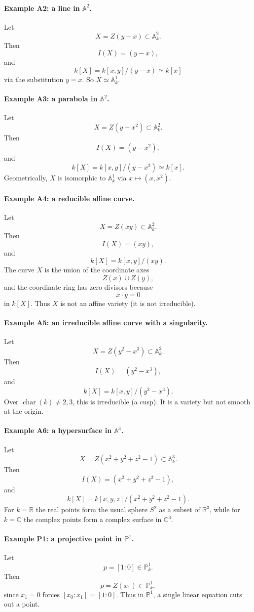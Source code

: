 \documentclass[12pt,a4paper]{article}
\theoremstyle{plain}
\theoremstyle{definition}      %
\begin{document}
\paragraph{Example A2: a line in \(\mathbb A^2\).}
Let
\[
X=Z(y-x)\subset \mathbb A^2_k.
\]
Then
\[
I(X)=(y-x),
\]
and
\[
k[X]=k[x,y]/(y-x)\simeq k[x]
\]
via the substitution \(y=x\).
So \(X\simeq \mathbb A^1_k\).

\paragraph{Example A3: a parabola in \(\mathbb A^2\).}
Let
\[
X=Z(y-x^2)\subset \mathbb A^2_k.
\]
Then
\[
I(X)=(y-x^2),
\]
and
\[
k[X]=k[x,y]/(y-x^2)\simeq k[x].
\]
Geometrically, \(X\) is isomorphic to \(\mathbb A^1_k\) via \(x\mapsto (x,x^2)\).

\paragraph{Example A4: a reducible affine curve.}
Let
\[
X=Z(xy)\subset \mathbb A^2_k.
\]
Then
\[
I(X)=(xy),
\]
and
\[
k[X]=k[x,y]/(xy).
\]
The curve \(X\) is the union of the coordinate axes
\[
Z(x)\cup Z(y),
\]
and the coordinate ring has zero divisors because
\[
\overline{x}\cdot \overline{y}=0
\]
in \(k[X]\).
Thus \(X\) is not an affine variety (it is not irreducible).

\paragraph{Example A5: an irreducible affine curve with a singularity.}
Let
\[
X=Z(y^2-x^3)\subset \mathbb A^2_k.
\]
Then
\[
I(X)=(y^2-x^3),
\]
and
\[
k[X]=k[x,y]/(y^2-x^3).
\]
Over \(\operatorname{char}(k)\neq 2,3\), this is irreducible (a cusp).
It is a variety but not smooth at the origin.

\paragraph{Example A6: a hypersurface in \(\mathbb A^3\).}
Let
\[
X=Z(x^2+y^2+z^2-1)\subset \mathbb A^3_k.
\]
Then
\[
I(X)=(x^2+y^2+z^2-1),
\]
and
\[
k[X]=k[x,y,z]/(x^2+y^2+z^2-1).
\]
For \(k=\mathbb R\) the real points form the usual sphere \(S^2\) as a subset of \(\mathbb R^3\),
while for \(k=\mathbb C\) the complex points form a complex surface in \(\mathbb C^3\).

\paragraph{Example P1: a projective point in \(\mathbb P^1\).}
Let
\[
p=[1:0]\in \mathbb P^1_k.
\]
Then
\[
p=Z(x_1)\subset \mathbb P^1_k,
\]
since \(x_1=0\) forces \([x_0:x_1]=[1:0]\).
Thus in \(\mathbb P^1\), a single linear equation cuts out a point.
\end{document}
